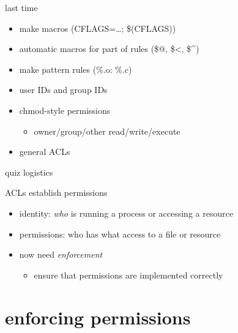 \date{}
\title{}
\date{}

\begin{frame}
    \titlepage
\end{frame}

\begin{frame}{last time}
    \begin{itemize}
    \item make macros (CFLAGS=\ldots; \$(CFLAGS))
    \item automatic macros for part of rules (\$@, \$<, \$^)
    \item make pattern rules (\%.o: \%.c)
    \vspace{.5cm}
    \item user IDs and group IDs
    \item chmod-style permissions
        \begin{itemize}
        \item owner/group/other read/write/execute
        \end{itemize}
    \item general ACLs
    \end{itemize}
\end{frame}

\begin{frame}{quiz logistics}
\end{frame}

\begin{frame}{ACLs establish permissions}
    \begin{itemize}
        \item identity: \textit{who} is running a process or accessing a resource
        \item permissions: who has what access to a file or resource
        \item now need \textit{enforcement}
            \begin{itemize}
            \item ensure that permissions are implemented correctly
            \end{itemize}
    \end{itemize}
\end{frame}

\section{enforcing permissions}


%

